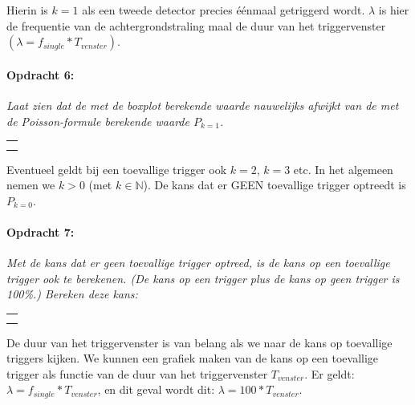 Hierin is $k=1$ als een tweede detector precies éénmaal getriggerd
wordt. $\lambda$ is hier de frequentie van de achtergrondstraling
maal de duur van het triggervenster $\left(\lambda=f_{single}*T_{venster}\right)$. 

\begin{minipage}[t]{1\columnwidth}%

\paragraph{Opdracht 6:}

\textit{Laat zien dat de met de boxplot berekende waarde nauwelijks
afwijkt van de met de Poisson-formule berekende waarde $P_{k=1}$.}

\begin{tabular}{>{\raggedright}p{16.6cm}}
    \tabularnewline
    \hline 
    \tabularnewline
    \hline 
    \tabularnewline
    \hline 
    \tabularnewline
    \hline 
\end{tabular}%
\end{minipage}

\bigskip{}


Eventueel geldt bij een toevallige trigger ook $k=2$, $k=3$ etc.
In het algemeen nemen we $k>0$ (met $k\mathbb{\in N}$). De kans
dat er GEEN toevallige trigger optreedt is $P_{k=0}$.

\begin{minipage}[t]{1\columnwidth}%

\paragraph{Opdracht 7:}

\textit{Met de kans dat er geen toevallige trigger optreed, is de
kans op een toevallige trigger ook te berekenen. (De kans op een trigger
plus de kans op geen trigger is 100\%.) Bereken deze kans:}

\begin{tabular}{>{\raggedright}p{16.6cm}}
\tabularnewline
\hline 
\tabularnewline
\hline 
\tabularnewline
\hline 
\tabularnewline
\hline 
\end{tabular}%
\end{minipage}

\bigskip{}


De duur van het triggervenster is van belang als we naar de kans op
toevallige triggers kijken. We kunnen een grafiek maken van de kans
op een toevallige trigger als functie van de duur van het triggervenster
$T_{venster}$. Er geldt: $\lambda=f_{single}*T_{venster}$, en dit
geval wordt dit: $\lambda=100*T_{venster}$$ $. 

